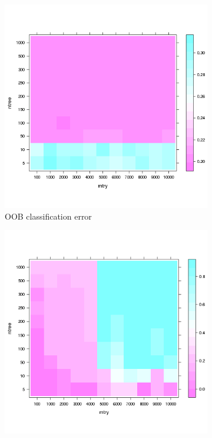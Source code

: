 \documentclass[10pt,letterpaper]{article}
\begin{document}
\begin{figure}[tbhp] 
 \begin{adjustwidth}{-1.00in}{0in}
  \begin{subfigure}[b]{0.5\linewidth}
    \centering
    \includegraphics[totalheight=8cm]{./figs/out-of-bag-prediction-error.png}
    \caption{OOB classification error} 
    \label{fig7:b} 
    \vspace{4ex}
  \end{subfigure} 
  \begin{subfigure}[b]{0.5\linewidth}
    \centering
    \includegraphics[totalheight=8cm]{./figs/rbo.png}

\end{subfigure}
\end{adjustwidth}
\end{figure}
\end{document}
